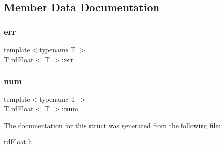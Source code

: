 \subsection{Member Data Documentation}
\mbox{\label{structrd_float_a7a247930d2563de793390e320d81d33c}} 
\subsubsection{\texorpdfstring{err}{err}}
{\footnotesize\ttfamily template$<$typename T $>$ \\
T \mbox{\hyperlink{structrd_float}{rd\+Float}}$<$ T $>$\+::err}

\mbox{\label{structrd_float_acfb5377d16466e5c9e6549b3cc075ec0}} 
\subsubsection{\texorpdfstring{num}{num}}
{\footnotesize\ttfamily template$<$typename T $>$ \\
T \mbox{\hyperlink{structrd_float}{rd\+Float}}$<$ T $>$\+::num}



The documentation for this struct was generated from the following file\+:\begin{DoxyCompactItemize}
\item 
\mbox{\hyperlink{rd_float_8h}{rd\+Float.\+h}}\end{DoxyCompactItemize}
